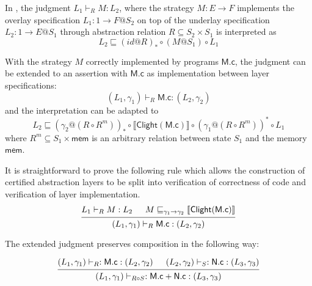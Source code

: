 \documentclass[sigplan,10pt,review,anonymous]{acmart}
\newcommand{\kw}[1]{\ensuremath{ \mathsf{#1} }}
\begin{document}
In \cite{rbgs-cal}, the judgment $L_1 \vdash_R M : L_2$, where the strategy
$M: E \rightarrow F$ implements the overlay specification
$L_1 : 1 \rightarrow F@S_2$ on top of the underlay specification
$L_2: 1 \rightarrow E@S_1$ through abstraction relation
$R \subseteq S_2 \times S_1$ is interpreted as
\[
  L_2 \sqsubseteq (id @ R)_* \circ (M@S_1) \circ L_1
\]

With the strategy $M$ correctly implemented by programs $\kw{M.c}$, the judgment
can be extended to an assertion with $\kw{M.c}$ as implementation between layer
specifications:
\[
  (L_1, \gamma_1) \vdash_R \kw{M.c} : (L_2, \gamma_2)
\]
and the interpretation can be adapted to
\[
  L_2 \sqsubseteq (\gamma_2 @ (R \circ R^m))_* \circ \llbracket \kw{Clight(\kw{M.c})}
  \rrbracket \circ (\gamma_1 @ (R \circ R^m))^* \circ L_1
\]
where $R^m \subseteq S_1 \times \kw{mem}$ is an arbitrary relation between state
$S_1$ and the memory $\kw{mem}$.

It is straightforward to prove the following rule which allows the construction
of certified abstraction layers to be split into verification of correctness of
code and verification of layer implementation.
\[
  \begin{prooftree}
    \hypo{L_1 \vdash_R M : L_2 }
    \hypo{M \sqsubseteq_{\gamma_1 \rightarrow \gamma_2} \llbracket \kw{Clight}(\kw{M.c}) \rrbracket}
    \infer2{(L_1, \gamma_1) \vdash_R \kw{M.c} : (L_2,\gamma_2)}
  \end{prooftree}
\]

The extended judgment preserves composition in the following way:

\[
  \begin{prooftree}
    \hypo{(L_1, \gamma_1) \vdash_R : \kw{M.c} : (L_2, \gamma_2)}
    \hypo{(L_2, \gamma_2) \vdash_S : \kw{N.c} : (L_3, \gamma_3)}
    \infer2{(L_1, \gamma_1) \vdash_{R \circ S} : \kw {M.c} + \kw{N.c} : (L_3, \gamma_3) }
  \end{prooftree}
\]
\end{document}
